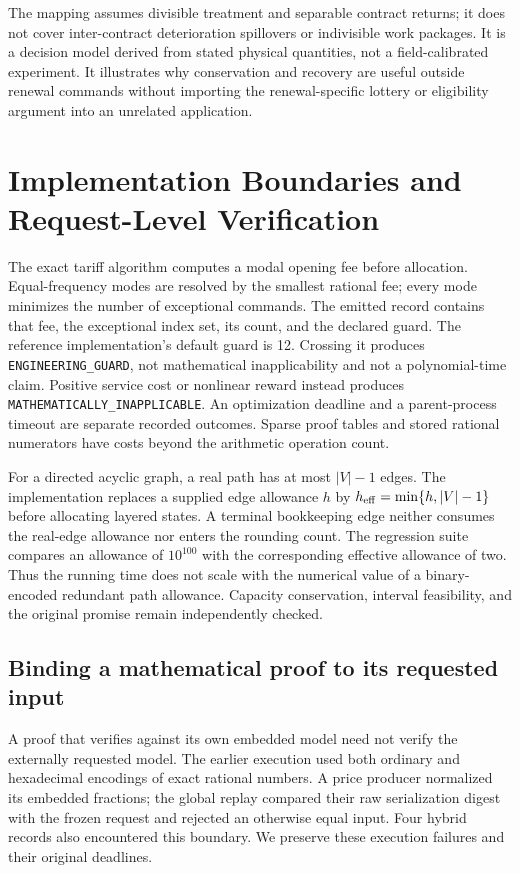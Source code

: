 \documentclass[11pt,letterpaper]{article}
\theoremstyle{definition}\newtheorem{remark}[theorem]{Remark}
\begin{document}
The mapping assumes divisible treatment and separable contract returns; it does not cover inter-contract deterioration spillovers or indivisible work packages. It is a decision model derived from stated physical quantities, not a field-calibrated experiment. It illustrates why conservation and recovery are useful outside renewal commands without importing the renewal-specific lottery or eligibility argument into an unrelated application.
\section{Implementation Boundaries and Request-Level Verification}\label{sec:implementation63}
The exact tariff algorithm computes a modal opening fee before allocation. Equal-frequency modes are resolved by the smallest rational fee; every mode minimizes the number of exceptional commands. The emitted record contains that fee, the exceptional index set, its count, and the declared guard. The reference implementation's default guard is 12. Crossing it produces \texttt{ENGINEERING\_GUARD}, not mathematical inapplicability and not a polynomial-time claim. Positive service cost or nonlinear reward instead produces \texttt{MATHEMATICALLY\_INAPPLICABLE}. An optimization deadline and a parent-process timeout are separate recorded outcomes. Sparse proof tables and stored rational numerators have costs beyond the arithmetic operation count.

For a directed acyclic graph, a real path has at most $|V|-1$ edges. The implementation replaces a supplied edge allowance $h$ by $h_{\rm eff}=\min\{h,|V|-1\}$ before allocating layered states. A terminal bookkeeping edge neither consumes the real-edge allowance nor enters the rounding count. The regression suite compares an allowance of $10^{100}$ with the corresponding effective allowance of two. Thus the running time does not scale with the numerical value of a binary-encoded redundant path allowance. Capacity conservation, interval feasibility, and the original promise remain independently checked.

\subsection{Binding a mathematical proof to its requested input}\label{sec:binding63}
A proof that verifies against its own embedded model need not verify the externally requested model. The earlier execution used both ordinary and hexadecimal encodings of exact rational numbers. A price producer normalized its embedded fractions; the global replay compared their raw serialization digest with the frozen request and rejected an otherwise equal input. Four hybrid records also encountered this boundary. We preserve these execution failures and their original deadlines.
\end{document}
